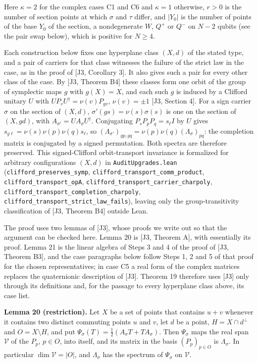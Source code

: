\documentclass[11pt,a4paper]{article}
\newcommand{\gt}{>}
\begin{document}
Here \(\kappa=2\) for the complex cases C1 and C6 and \(\kappa=1\) otherwise, \(r\gt0\) is the number of
section points at which \(\sigma\) and \(\tau\) differ, and \(\lvert Y_0\rvert\) is the number of points of the base
\(Y_0\) of the section, a nondegenerate \(W\), \(Q^+\) or \(Q^-\) on \(N-2\) qubits (see the pair swap below),
which is positive for \(N\ge4\).

Each construction below fixes one hyperplane class \((X,d)\) of the stated type, and a pair of carriers
for that class witnesses the failure of the strict law in the case, as in the proof of {[}J3, Corollary 3{]}.
It also gives such a pair for every other class of the case. By {[}J3, Theorem B4{]} these classes form one orbit of the group of
symplectic maps \(g\) with \(g(X)=X\), and each such \(g\) is induced by a Clifford unitary \(U\) with
\(UP_vU^\dagger=\nu(v)P_{gv}\), \(\nu(v)=\pm1\) {[}J3, Section 4{]}. For a sign carrier \(\sigma\) on the section of
\((X,d)\), \(\sigma'(gs)=\nu(s)\sigma(s)\) is one on the section of \((X,gd)\), with \(A_{\sigma'}=UA_\sigma U^\dagger\).
Conjugating \(P_sP_pP_q=s_\ell I\) by \(U\) gives \(s_{g\ell}=\nu(s)\nu(p)\nu(q)s_\ell\), so
\((\Lambda_{\sigma'})_{gp,gq}=\nu(p)\nu(q)(\Lambda_\sigma)_{pq}\): the completion matrix is conjugated by a
signed permutation. Both spectra are therefore preserved. This signed-Clifford orbit-transport invariance
is formalized for arbitrary configurations \((X,d)\) in \nolinkurl{AuditUpgrades.lean} (\nolinkurl{clifford_preserves_symp},
\nolinkurl{clifford_transport_comm_product}, \nolinkurl{clifford_transport_opA}, \nolinkurl{clifford_transport_carrier_charpoly},
\nolinkurl{clifford_transport_completion_charpoly}, \nolinkurl{clifford_transport_strict_law_fails}), leaving only the
group-transitivity classification of {[}J3, Theorem B4{]} outside Lean.

The proof uses two lemmas of {[}J3{]}, whose proofs we write out so that the argument can be checked
here. Lemma 20 is {[}J3, Theorem A{]}, with essentially its proof. Lemma 21 is the linear algebra of Steps 3
and 4 of the proof of {[}J3, Theorem B3{]}, and the case paragraphs below follow Steps 1, 2 and 5 of that
proof for the chosen representatives; in case C5 a real form of the complex matrices replaces the
quaternionic description of {[}J3{]}. Theorem 19 therefore uses {[}J3{]} only through its definitions and,
for the passage to every hyperplane class above, its case list.

\textbf{Lemma 20 (restriction).} Let \(X\) be a set of points that contains \(u+v\) whenever it contains two
distinct commuting points \(u\) and \(v\), let \(d\) be a point, \(H=X\cap d^\perp\) and \(O=X\setminus H\), and put
\(\Psi_\sigma(T)=\frac12(A_\sigma T+TA_\sigma)\). Then \(\Psi_\sigma\) maps the real span \(\mathcal V\) of the \(P_p\),
\(p\in O\), into itself, and its matrix in the basis \((P_p)_{p\in O}\) is \(\Lambda_\sigma\). In particular
\(\dim\mathcal V=|O|\), and \(\Lambda_\sigma\) has the spectrum of \(\Psi_\sigma\) on \(\mathcal V\).
\end{document}
